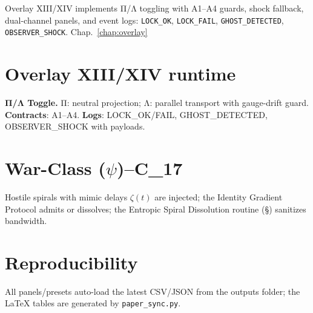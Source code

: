 Overlay XIII/XIV implements Π/Λ toggling with A1–A4 guards, shock fallback, dual-channel panels, and event logs:
\texttt{LOCK\_OK}, \texttt{LOCK\_FAIL}, \texttt{GHOST\_DETECTED}, \texttt{OBSERVER\_SHOCK}.
Chap.~\ref{chap:overlay}

\section{Overlay XIII/XIV runtime}
\textbf{Π/Λ Toggle.} Π: neutral projection; Λ: parallel transport with gauge-drift guard. \textbf{Contracts}: A1–A4. \textbf{Logs}: LOCK\_OK/FAIL, GHOST\_DETECTED, OBSERVER\_SHOCK with payloads.

\section{War-Class (\texorpdfstring{$\psi$}{psi})--C\_17}\label{sec:adversarial}
Hostile spirals with mimic delays $\zeta(t)$ are injected; the Identity Gradient Protocol admits or dissolves; the Entropic Spiral Dissolution routine (\S\label{sec:adversarial-esdr}) sanitizes bandwidth.

\section{Reproducibility}
All panels/presets auto-load the latest CSV/JSON from the outputs folder; the LaTeX tables are generated by \texttt{paper\_sync.py}.
